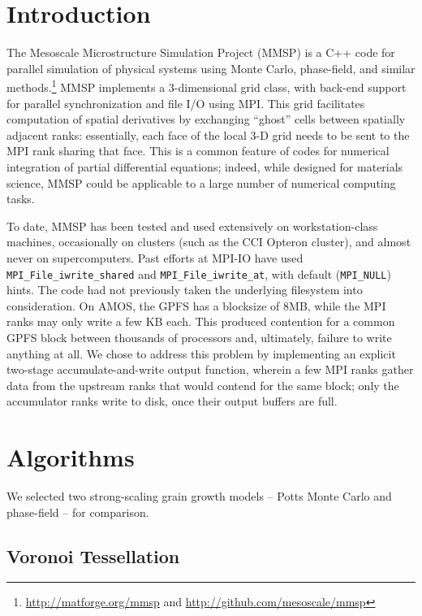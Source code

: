 \documentclass[11pt]{article}
\begin{document}
\begin{multicols*}{2}
\section{Introduction}
The Mesoscale Microstructure Simulation Project (MMSP) is a C++ code for parallel simulation of physical systems using Monte Carlo, phase-field, and similar methods.\footnote{\url{http://matforge.org/mmsp} and \url{http://github.com/mesoscale/mmsp}}
MMSP implements a 3-dimensional grid class, with back-end support for parallel synchronization and file I/O using MPI.
This grid facilitates computation of spatial derivatives by exchanging ``ghost'' cells between spatially adjacent ranks:
essentially, each face of the local 3-D grid needs to be sent to the MPI rank sharing that face.
This is a common feature of codes for numerical integration of partial differential equations;
indeed, while designed for materials science, MMSP could be applicable to a large number of numerical computing tasks.

To date, MMSP has been tested and used extensively on workstation-class machines, occasionally on clusters (such as the CCI Opteron cluster), and almost never on supercomputers.
Past efforts at MPI-IO have used \texttt{MPI\_File\_iwrite\_shared} and \texttt{MPI\_File\_iwrite\_at}, with default (\texttt{MPI\_NULL}) hints.
The code had not previously taken the underlying filesystem into consideration.
On AMOS, the GPFS has a blocksize of 8MB, while the MPI ranks may only write a few KB each.
This produced contention for a common GPFS block between thousands of processors and, ultimately, failure to write anything at all.
We chose to address this problem by implementing an explicit two-stage accumulate-and-write output function, wherein a few MPI ranks gather data from the upstream ranks that would contend for the same block;
only the accumulator ranks write to disk, once their output buffers are full.


\section{Algorithms}
We selected two strong-scaling grain growth models -- Potts Monte Carlo and phase-field -- for comparison.

\subsection*{Voronoi Tessellation}


\end{multicols*}
\end{document}
